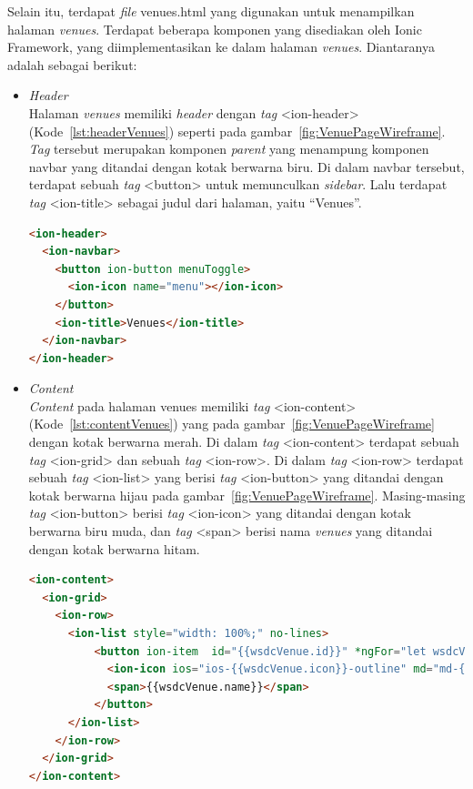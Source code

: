 \begin{itemize}
	Selain itu, terdapat \textit{file} venues.html yang digunakan untuk menampilkan halaman \textit{venues}. Terdapat beberapa komponen yang disediakan oleh Ionic Framework, yang diimplementasikan ke dalam halaman \textit{venues}. Diantaranya adalah sebagai berikut:	
	
	\begin{itemize}
		\item \textit{Header} \\
		Halaman \textit{venues} memiliki \textit{header} dengan \textit{tag} <ion-header> (Kode~\ref{lst:headerVenues}) seperti pada gambar~\ref{fig:VenuePageWireframe}. \textit{Tag} tersebut merupakan komponen \textit{parent} yang menampung komponen navbar yang ditandai dengan kotak berwarna biru. Di dalam navbar tersebut, terdapat sebuah \textit{tag} <button> untuk memunculkan \textit{sidebar}. Lalu terdapat \textit{tag} <ion-title> sebagai judul dari halaman, yaitu ``Venues''.
		
\begin{lstlisting}[language=html, label={lst:headerVenues}, caption=\textit{Header} pada venues.html]
<ion-header>
  <ion-navbar>
    <button ion-button menuToggle>
      <ion-icon name="menu"></ion-icon>
    </button>
    <ion-title>Venues</ion-title>
  </ion-navbar>
</ion-header>
\end{lstlisting}

		\item \textit{Content} \\
		\textit{Content} pada halaman venues memiliki \textit{tag} <ion-content> (Kode~\ref{lst:contentVenues}) yang pada gambar~\ref{fig:VenuePageWireframe} dengan kotak berwarna merah. Di dalam \textit{tag} <ion-content> terdapat sebuah \textit{tag} <ion-grid> dan sebuah \textit{tag} <ion-row>. Di dalam \textit{tag} <ion-row> terdapat sebuah \textit{tag} <ion-list> yang berisi \textit{tag} <ion-button> yang ditandai dengan kotak berwarna hijau pada gambar~\ref{fig:VenuePageWireframe}. Masing-masing \textit{tag} <ion-button> berisi \textit{tag} <ion-icon> yang ditandai dengan kotak berwarna biru muda, dan \textit{tag} <span> berisi nama \textit{venues} yang ditandai dengan kotak berwarna hitam. 
		
\begin{lstlisting}[language=html, label={lst:contentVenues}, caption=\textit{Content} pada venues.html]
<ion-content>
  <ion-grid>
    <ion-row>
      <ion-list style="width: 100%;" no-lines>
          <button ion-item  id="{{wsdcVenue.id}}" *ngFor="let wsdcVenue of venuesData" (click)="itemTapped($event, wsdcVenue)">
            <ion-icon ios="ios-{{wsdcVenue.icon}}-outline" md="md-{{wsdcVenue.icon}}" item-start></ion-icon>
            <span>{{wsdcVenue.name}}</span>
          </button>
      </ion-list>
    </ion-row>
  </ion-grid>
</ion-content>
\end{lstlisting}
	\end{itemize}


\end{itemize}
